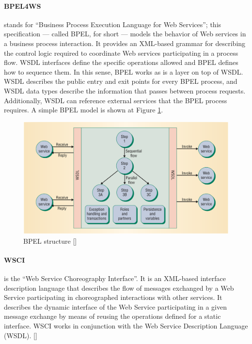 \paragraph{BPEL4WS} 
stands for ``Business Process Execution Language for Web Services''; this specification — called BPEL, for short — models the behavior of Web services in a business process interaction. It provides an XML-based grammar for describing the control logic required to coordinate Web services participating in a process flow. WSDL interfaces define the specific operations allowed and BPEL defines how to sequence them. In this sense, BPEL works as is a layer on top of WSDL. WSDL describes the public entry and exit points for every BPEL process, and WSDL data types describe the information that passes between process requests. Additionally, WSDL can reference external services that the BPEL process requires. A simple BPEL model is shown at Figure \ref{BPELstructure}.

\begin{figure}[h]
  \centering
  \includegraphics[width=\textwidth]{images/BPELstructure}
  \caption{BPEL structure [\citet{WSOC}]}
  \label{BPELstructure}
\end{figure}

\paragraph{WSCI}
is the ``Web Service Choreography Interface''. It is an XML-based interface description language that describes the flow of messages exchanged by a Web Service participating in choreographed interactions with other services. It describes the dynamic interface of the Web Service participating in a given message exchange by means of reusing the operations defined for a static interface. WSCI works in conjunction with the Web Service Description Language (WSDL). [\citet{WSCI}]


